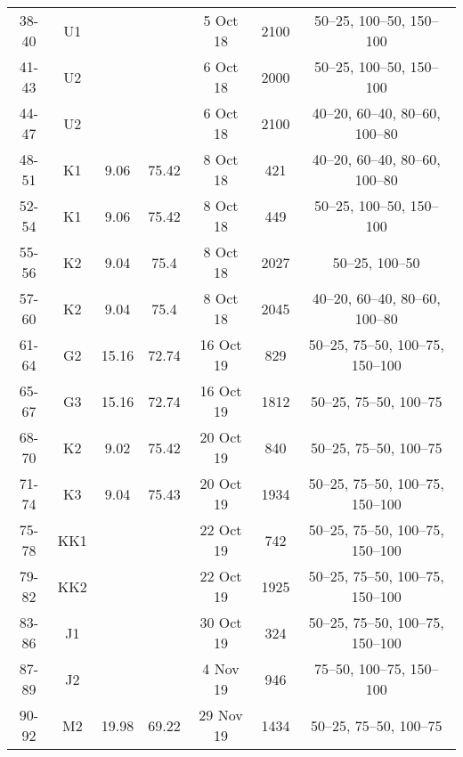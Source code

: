 \documentclass{article}
\begin{document}
\begin{table}[htbp]
{\begin{adjustwidth}{0in}{0in}
\begin{tabular}{ccccccc}
				38-40       & U1  &            &            & 5 Oct 18                  & 2100       & 50–25, 100–50, 150–100        \\
				41-43       & U2  &            &            & 6 Oct 18                  & 2000       & 50–25, 100–50, 150–100        \\
				44-47       & U2  &            &            & 6 Oct 18                  & 2100       & 40–20, 60–40, 80–60, 100–80   \\
				48-51       & K1  & 9.06       & 75.42      & 8 Oct 18                  & 421        & 40–20, 60–40, 80–60, 100–80   \\
				52-54       & K1  & 9.06       & 75.42      & 8 Oct 18                  & 449        & 50–25, 100–50, 150–100        \\
				55-56       & K2  & 9.04       & 75.4       & 8 Oct 18                  & 2027       & 50–25, 100–50                 \\
				57-60       & K2  & 9.04       & 75.4       & 8 Oct 18                  & 2045       & 40–20, 60–40, 80–60, 100–80   \\
				\midrule
				61-64       & G2  & 15.16      & 72.74      & 16 Oct 19                 & 829        & 50–25, 75–50, 100–75, 150–100 \\
				65-67       & G3  & 15.16      & 72.74      & 16 Oct 19                 & 1812       & 50–25, 75–50, 100–75          \\
				68-70       & K2  & 9.02       & 75.42      & 20 Oct 19                 & 840        & 50–25, 75–50, 100–75          \\
				71-74       & K3  & 9.04       & 75.43      & 20 Oct 19                 & 1934       & 50–25, 75–50, 100–75, 150–100 \\
				75-78       & KK1 &            &            & 22 Oct 19                 & 742        & 50–25, 75–50, 100–75, 150–100 \\
				79-82       & KK2 &            &            & 22 Oct 19                 & 1925       & 50–25, 75–50, 100–75, 150–100 \\
				83-86         & J1  &            &            & 30 Oct 19                 & 324        & 50–25, 75–50, 100–75, 150–100 \\
				87-89         & J2  &            &            & 4 Nov 19                  & 946        & 75–50, 100–75, 150–100        \\
				90-92         & M2  & 19.98      & 69.22      & 29 Nov 19                 & 1434       & 50–25, 75–50, 100–75          \\

\end{tabular}
\end{adjustwidth}}
\end{table}
\end{document}
